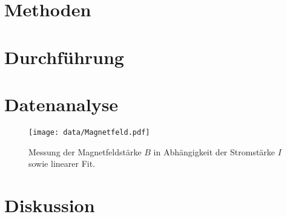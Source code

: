 \section{Methoden} \label{sec:Methoden}
	
\section{Durchführung}
		
\section{Datenanalyse} \label{sec:Analyse}
	
	\begin{figure}[ht]
		\centering
		\texttt{[image: data/Magnetfeld.pdf]}
		\caption{Messung der Magnetfeldstärke $B$ in Abhängigkeit der Stromstärke $I$ sowie linearer Fit.}
		\label{fig:Magnetfeld}	
	\end{figure}		
			
\section{Diskussion}
